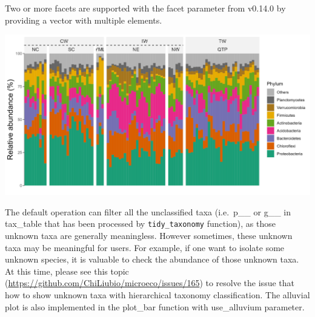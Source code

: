 \documentclass[
]{book}
\newenvironment{Shaded}{\begin{snugshade}}{\end{snugshade}}
\newcommand{\AttributeTok}[1]{\textcolor[rgb]{0.77,0.63,0.00}{#1}}
\newcommand{\CommentTok}[1]{\textcolor[rgb]{0.56,0.35,0.01}{\textit{#1}}}
\newcommand{\ConstantTok}[1]{\textcolor[rgb]{0.00,0.00,0.00}{#1}}
\newcommand{\DecValTok}[1]{\textcolor[rgb]{0.00,0.00,0.81}{#1}}
\newcommand{\FunctionTok}[1]{\textcolor[rgb]{0.00,0.00,0.00}{#1}}
\newcommand{\NormalTok}[1]{#1}
\newcommand{\SpecialCharTok}[1]{\textcolor[rgb]{0.00,0.00,0.00}{#1}}
\newcommand{\StringTok}[1]{\textcolor[rgb]{0.31,0.60,0.02}{#1}}
\begin{document}
Two or more facets are supported with the facet parameter from v0.14.0 by providing a vector with multiple elements.

\begin{Shaded}
\end{Shaded}

\begin{center}\includegraphics[width=750px]{Images/trans_abund_barplot_facet2} \end{center}

The default operation can filter all the unclassified taxa (i.e.~p\_\_ or g\_\_ in tax\_table that has been processed by \texttt{tidy\_taxonomy} function),
as those unknown taxa are generally meaningless.
However sometimes, these unknown taxa may be meaningful for users.
For example, if one want to isolate some unknown species, it is valuable to check the abundance of those unknown taxa.
At this time, please see this topic (\url{https://github.com/ChiLiubio/microeco/issues/165}) to resolve the issue that how to show unknown taxa with hierarchical taxonomy classification.
The alluvial plot is also implemented in the plot\_bar function with use\_alluvium parameter.
\end{document}
